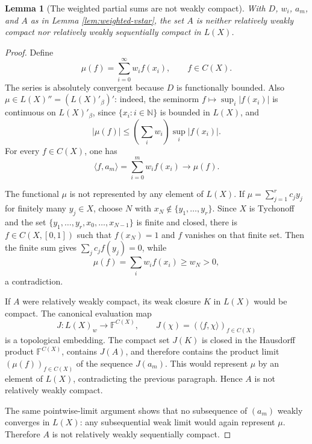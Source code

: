 \documentclass[11pt]{article}
\newtheorem{lemma}{Lemma}
\newcommand{\N}{\mathbb N}
\newcommand{\F}{\mathbb F}
\begin{document}
\begin{lemma}[The weighted partial sums are not weakly compact]
\label{lem:not-compact}
With \(D\), \(w_i\), \(a_m\), and \(A\) as in Lemma
\ref{lem:weighted-vstar}, the set \(A\) is neither relatively weakly
compact nor relatively weakly sequentially compact in \(L(X)\).
\end{lemma}

\begin{proof}
Define
\[
  \mu(f)=\sum_{i=0}^{\infty}w_i f(x_i),\qquad f\in C(X).
\]
The series is absolutely convergent because \(D\) is functionally bounded.
Also \(\mu\in L(X)''=(L(X)'_\beta)'\): indeed, the seminorm
\(f\mapsto\sup_i|f(x_i)|\) is continuous on \(L(X)'_\beta\), since
\(\{x_i:i\in\N\}\) is bounded in \(L(X)\), and
\[
  |\mu(f)|\le \left(\sum_iw_i\right)\sup_i|f(x_i)|.
\]
For every \(f\in C(X)\), one has
\[
  \langle f,a_m\rangle=\sum_{i=0}^m w_i f(x_i)\longrightarrow \mu(f).
\]

The functional \(\mu\) is not represented by any element of \(L(X)\). If
\(\mu=\sum_{j=1}^r c_j y_j\) for finitely many \(y_j\in X\), choose
\(N\) with \(x_N\notin \{y_1,\ldots,y_r\}\). Since \(X\) is Tychonoff and
the set \(\{y_1,\ldots,y_r,x_0,\ldots,x_{N-1}\}\) is finite and closed,
there is \(f\in C(X,[0,1])\) such that \(f(x_N)=1\) and \(f\) vanishes on
that finite set. Then the finite sum gives \(\sum_j c_j f(y_j)=0\), while
\[
  \mu(f)=\sum_i w_i f(x_i)\ge w_N>0,
\]
a contradiction.

If \(A\) were relatively weakly compact, its weak closure \(K\) in
\(L(X)\) would be compact. The canonical evaluation map
\[
  J:L(X)_w\to \F^{C(X)},\qquad J(\chi)=(\langle f,\chi\rangle)_{f\in C(X)}
\]
is a topological embedding. The compact set \(J(K)\) is closed in the
Hausdorff product \(\F^{C(X)}\), contains \(J(A)\), and therefore contains
the product limit \((\mu(f))_{f\in C(X)}\) of the sequence \(J(a_m)\).
This would represent \(\mu\) by an element of \(L(X)\), contradicting the
previous paragraph. Hence \(A\) is not relatively weakly compact.

The same pointwise-limit argument shows that no subsequence of
\((a_m)\) weakly converges in \(L(X)\): any subsequential weak limit would
again represent \(\mu\). Therefore \(A\) is not relatively weakly
sequentially compact.
\end{proof}
\end{document}
